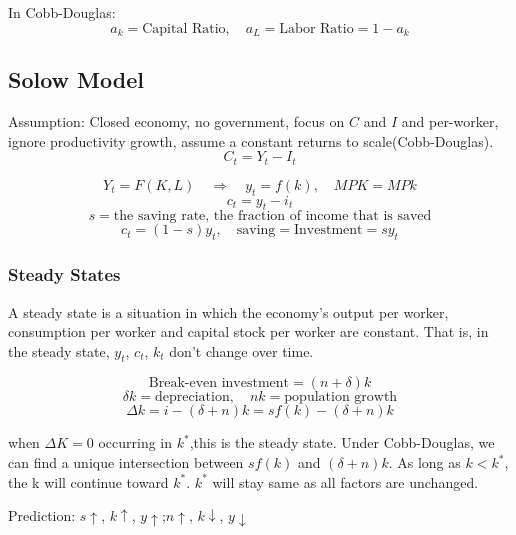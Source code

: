 \documentclass[10pt, a4paper]{article}
\begin{document}
        In Cobb-Douglas:
        $$a_k = \text{Capital Ratio},\quad a_L = \text{Labor Ratio} = 1 - a_k$$
    \subsection{Solow Model}
        Assumption: Closed economy, no government, focus on $C$ and $I$ and per-worker, ignore productivity growth, assume a constant returns to scale(Cobb-Douglas). 
        $$C_t = Y_t - I_t$$

        $$Y_t = F(K, L)\quad \Rightarrow\quad y_t = f(k),\quad MPK = MPk$$
        $$c_t = y_t - i_t$$
        $$s = \text{the saving rate, the fraction of income that is saved}$$
        $$c_t = (1 - s)y_t,\quad \text{saving} = \text{Investment} = sy_t$$

        \subsubsection{Steady States}
            A steady state is a situation in which the economy's output per worker, consumption per worker and capital stock per worker are constant. That is, in the steady state, $y_t$, $c_t$, $k_t$ don't change over time. 

            $$\text{Break-even investment} = (n + \delta)k$$
            $$\delta k = \text{depreciation},\quad nk = \text{population growth}$$
            $$\Delta k = i - (\delta + n)k = sf(k) - (\delta + n)k$$

            when $\Delta K = 0$ occurring in  $k^*$,this is the steady state. Under Cobb-Douglas, we can find a unique intersection between $sf(k)$ and $(\delta + n)k$. As long as $k < k^*$, the k will continue toward $k^*$. $k^*$ will stay same as all factors are unchanged. 

            Prediction: $s\uparrow$, $k\uparrow$, $y\uparrow$;\quad $n\uparrow$, $k\downarrow$, $y\downarrow$
\end{document}
